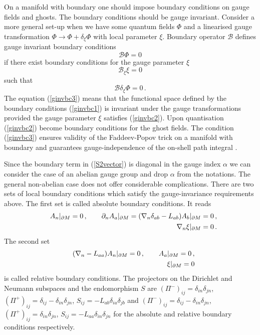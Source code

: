On a manifold with boundary one should impose 
boundary conditions on gauge fields and  ghosts.
The boundary conditions should be gauge invariant.
Consider a more general set-up when we have some
quantum fields $\Phi$ and a linearised
gauge transformation $\Phi\to\Phi +\delta_\xi \Phi$
with local parameter $\xi$. Boundary operator 
$\mathcal{B}$ defines gauge invariant boundary conditions
\begin{equation}
\mathcal{B}\Phi  =0
\label{ginvbc1}
\end{equation}
if there exist boundary conditions for the gauge
parameter $\xi$ 
\begin{equation}
\mathcal{B}_\xi \xi  =0 
\label{ginvbc2}
\end{equation}
such that 
\begin{equation}
\mathcal{B} \delta_\xi \Phi  =0 \,.
\label{ginvbc3}
\end{equation}
The equation (\ref{ginvbc3}) means that the
functional space defined by the boundary conditions (\ref{ginvbc1})
is invariant under the gauge transformations provided the gauge
parameter $\xi$ satisfies (\ref{ginvbc2}). Upon quantisation
(\ref{ginvbc2}) become boundary conditions for the ghost fields.
The condition (\ref{ginvbc3}) ensures validity of the 
Faddeev-Popov trick on a manifold with boundary and
guarantees gauge-independence of the on-shell path integral
\cite{Vassilevich:1998iz}.

Since the boundary term in (\ref{S2vector}) is diagonal
in the gauge index $\alpha$ we can consider the case
of an abelian gauge group and drop $\alpha$ from the
notations. The general non-abelian case does not offer
considerable complications. There are two sets of local
boundary conditions which satisfy the gauge-invariance
requirements above. The first set is called absolute
boundary conditions. It reads
\begin{eqnarray}
&&A_n\vert_{\partial M} =0\,,\qquad \partial_n A_a \vert_{\partial M} =
(\nabla_n \delta_{ab} -L_{ab} )A_b\vert_{\partial M} =0 \,,
\nonumber \\
&&\nabla_n \xi \vert_{\partial M} =0 \,.\label{absbc}
\end{eqnarray}
The second set
\begin{eqnarray}
&&(\nabla_n -L_{aa})A_n \vert_{\partial M} =0\,, \qquad A_a\vert_{\partial M} =0\,,
\nonumber \\
&& \xi \vert_{\partial M} =0 \label{relbc}
\end{eqnarray}
is called relative boundary conditions. 
The projectors on the Dirichlet and Neumann subspaces and the 
endomorphism $S$ are $(\Pi^-)_{ij}=\delta_{in}\delta_{jn}$,
$(\Pi^+)_{ij}=\delta_{ij}-\delta_{in}\delta_{jn}$, 
$S_{ij}=-L_{ab}\delta_{ia}\delta_{jb}$ and
$(\Pi^-)_{ij}=\delta_{ij}-\delta_{in}\delta_{jn}$,
$(\Pi^+)_{ij}=\delta_{in}\delta_{jn}$,
$S_{ij}=-L_{aa}\delta_{in}\delta_{jn}$ for the absolute and
relative boundary conditions respectively.

